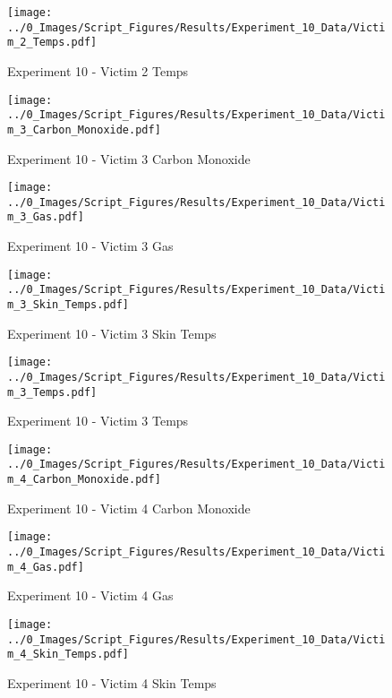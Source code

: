 	\begin{figure}[H]
		\centering
		\texttt{[image: ../0\_Images/Script\_Figures/Results/Experiment\_10\_Data/Victim\_2\_Temps.pdf]}
		\caption[]{Experiment 10 - Victim 2 Temps}
	\end{figure}
 
	\clearpage

	\begin{figure}[H]
		\centering
		\texttt{[image: ../0\_Images/Script\_Figures/Results/Experiment\_10\_Data/Victim\_3\_Carbon\_Monoxide.pdf]}
		\caption[]{Experiment 10 - Victim 3 Carbon Monoxide}
	\end{figure}
 

	\begin{figure}[H]
		\centering
		\texttt{[image: ../0\_Images/Script\_Figures/Results/Experiment\_10\_Data/Victim\_3\_Gas.pdf]}
		\caption[]{Experiment 10 - Victim 3 Gas}
	\end{figure}
 
	\clearpage

	\begin{figure}[H]
		\centering
		\texttt{[image: ../0\_Images/Script\_Figures/Results/Experiment\_10\_Data/Victim\_3\_Skin\_Temps.pdf]}
		\caption[]{Experiment 10 - Victim 3 Skin Temps}
	\end{figure}
 

	\begin{figure}[H]
		\centering
		\texttt{[image: ../0\_Images/Script\_Figures/Results/Experiment\_10\_Data/Victim\_3\_Temps.pdf]}
		\caption[]{Experiment 10 - Victim 3 Temps}
	\end{figure}
 
	\clearpage

	\begin{figure}[H]
		\centering
		\texttt{[image: ../0\_Images/Script\_Figures/Results/Experiment\_10\_Data/Victim\_4\_Carbon\_Monoxide.pdf]}
		\caption[]{Experiment 10 - Victim 4 Carbon Monoxide}
	\end{figure}
 

	\begin{figure}[H]
		\centering
		\texttt{[image: ../0\_Images/Script\_Figures/Results/Experiment\_10\_Data/Victim\_4\_Gas.pdf]}
		\caption[]{Experiment 10 - Victim 4 Gas}
	\end{figure}
 
	\clearpage

	\begin{figure}[H]
		\centering
		\texttt{[image: ../0\_Images/Script\_Figures/Results/Experiment\_10\_Data/Victim\_4\_Skin\_Temps.pdf]}
		\caption[]{Experiment 10 - Victim 4 Skin Temps}
	\end{figure}
 

